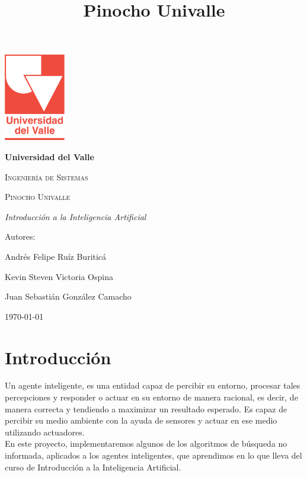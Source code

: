 \documentclass[12pt, letterpaper]{article}
\title{Pinocho Univalle}
\begin{document}
\begin{titlepage}
\centering
{\includegraphics[width=0.2\textwidth]{images/logo.png}\par}
\vspace{1cm}
{\bfseries\LARGE Universidad del Valle \par}
\vspace{1cm}
{\scshape\Large Ingeniería de Sistemas \par}
\vfill
{\scshape\Huge Pinocho Univalle \par}
\vfill
{\itshape\Large Introducción a la Inteligencia Artificial \par}
\vfill
{\Large Autores: \par}
{\Large Andrés Felipe Ruíz Buriticá \par}
{\Large Kevin Steven Victoria Ospina \par}
{\Large Juan Sebastián González Camacho \par}
\vfill
{\Large \today \par}
\end{titlepage}
\tableofcontents
\clearpage
\section{Introducción}
Un agente inteligente, es una entidad capaz de percibir su entorno, procesar tales percepciones y responder o actuar en su entorno de manera racional, es decir, de manera correcta y tendiendo a maximizar un resultado esperado. Es capaz de percibir su medio ambiente con la ayuda de sensores y actuar en ese medio utilizando actuadores.
\newline \\
En este proyecto, implementaremos algunos de los algoritmos de búsqueda no informada, aplicados a los agentes inteligentes, que aprendimos en lo que lleva del curso de Introducción a la Inteligencia Artificial.
\clearpage
\end{document}
